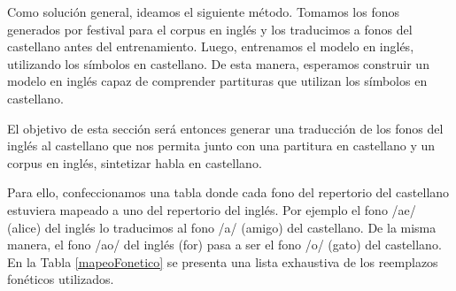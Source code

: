 Como solución general, ideamos el siguiente método. Tomamos los fonos generados por festival para el corpus en inglés y los traducimos a fonos del castellano antes del entrenamiento. Luego, entrenamos el modelo en inglés, utilizando los símbolos en castellano. De esta manera, esperamos construir un modelo en inglés capaz de comprender partituras que utilizan los símbolos en castellano.

El objetivo de esta sección será entonces generar una traducción de los fonos del inglés al castellano que nos permita junto con una partitura en castellano y un corpus en inglés, sintetizar habla en castellano.

Para ello, confeccionamos una tabla donde cada fono del repertorio del castellano estuviera mapeado a uno del repertorio del inglés. Por ejemplo el fono /ae/ (alice) del inglés lo traducimos al fono /a/ (amigo) del castellano. De la misma manera, el fono /ao/ del inglés (for) pasa a ser el fono /o/ (gato) del castellano. En la Tabla \ref{mapeoFonetico} se presenta una lista exhaustiva de los reemplazos fonéticos utilizados.

